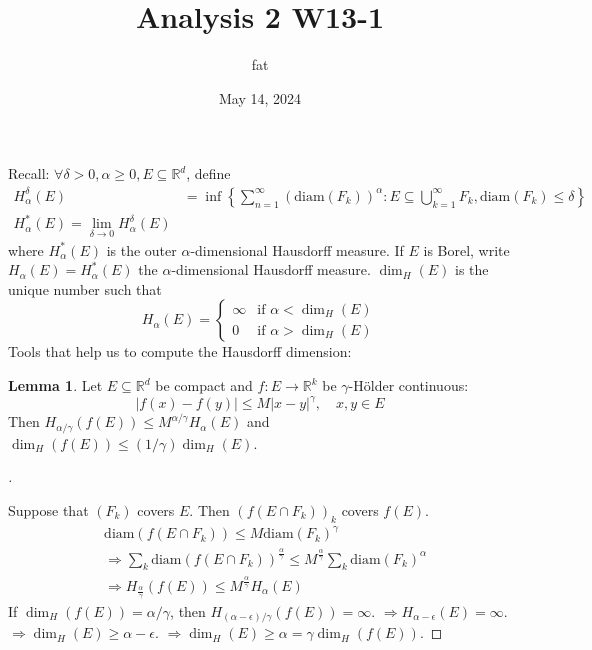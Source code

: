 \documentclass{article}
\title{Analysis 2 W13-1}
\author{fat}
\date{May 14, 2024}
\theoremstyle{definition}
\newtheorem{lem}{Lemma}
\newenvironment{proofs}[1][\proofname]{%
  \begin{proof}[#1]$ $\par\nobreak\ignorespaces
}{%
  \end{proof}
}
\newcommand{\RR}{\mathbb R}
\newcommand{\Ra}{\Rightarrow}
\begin{document}
\maketitle
\thispagestyle{fancy}
\renewcommand{\footrulewidth}{0.4pt}
\cfoot{\thepage}
\renewcommand{\headrulewidth}{0.4pt}

Recall: $\forall \delta > 0, \alpha \geq 0, E \subseteq \RR^d$, define 
\[
	\begin{split}
		H_\alpha^\delta(E) &= \inf \left\{ \sum_{n = 1}^\infty (\text{diam}(F_k))^\alpha: E \subseteq \bigcup_{k = 1}^\infty F_k, \text{diam}(F_k) \leq \delta \right\}\\
		H_\alpha^*(E) = \lim_{\delta \to 0} H_\alpha^\delta(E)
	\end{split}
\]
where $H_\alpha^*(E)$ is the outer $\alpha$-dimensional Hausdorff measure.
If $E$ is Borel, write $H_\alpha(E) = H_\alpha^*(E)$ the $\alpha$-dimensional Hausdorff measure.
$\dim_H(E)$ is the unique number such that
\[
	H_\alpha(E) = 
	\begin{cases}
		\infty & \text{if } \alpha < \dim_H(E)\\
		0 & \text{if } \alpha > \dim_H(E)
	\end{cases}
\]
Tools that help us to compute the Hausdorff dimension:

\begin{lem}
	Let $E \subseteq \RR^d$ be compact and $f: E \to \RR^k$ be $\gamma$-H\"older continuous:
	\[
		|f(x) - f(y)| \leq M |x - y|^\gamma, \quad x, y \in E
	\]
	Then $H_{\alpha/\gamma}(f(E)) \leq M^{\alpha/\gamma}H_\alpha(E)$ and $\dim_H (f(E)) \leq (1/\gamma) \dim_H(E)$.
\end{lem}

\begin{proofs}
	Suppose that $(F_k)$ covers $E$.
	Then $(f(E \cap F_k))_k$ covers $f(E)$.
		\begin{align*}
			&\text{diam}(f(E \cap F_k)) \leq M \text{diam} (F_k)^\gamma\\
			&\Ra \sum_k \text{diam}(f(E \cap F_k))^{\frac{\alpha}{\gamma}} \leq M^{\frac{\alpha}{\gamma}} \sum_k \text{diam} (F_k)^\alpha\\
			&\Ra H_{\frac{\alpha}{\gamma}}(f(E)) \leq M^{\frac{\alpha}{\gamma}} H_\alpha(E)
		\end{align*}
		If $\dim_H(f(E)) = \alpha/\gamma$, then $H_{(\alpha - \epsilon)/\gamma}(f(E)) = \infty$.
		$\Ra H_{\alpha - \epsilon}(E) = \infty$.
		$\Ra \dim_H(E) \geq \alpha - \epsilon$.
		$\Ra \dim_H(E) \geq \alpha = \gamma \dim_H(f(E))$.
\end{proofs}
\end{document}
